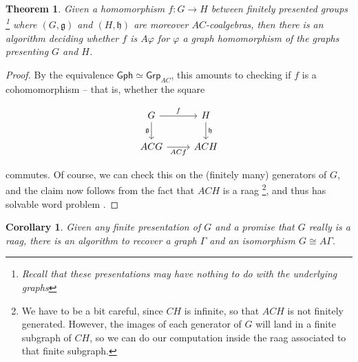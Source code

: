 \documentclass[12pt]{article}
\newtheorem{thm}{Theorem}
\newtheorem{cor}{Corollary}
\theoremstyle{definition}
\theoremstyle{theorem}
\newcommand*{\catFont}[1]{\mathsf{#1}}
\newcommand{\Grp}{\catFont{Grp}}
\begin{document}
\begin{thm}
  Given a homomorphism $f : G \to H$ between finitely presented groups%
  \footnote{Recall that these presentations may have nothing to do with the 
  underlying graphs} where $(G,\mathfrak{g})$ and $(H,\mathfrak{h})$ are 
  moreover $AC$-coalgebras, then there is an algorithm deciding 
  whether $f$ is $A \varphi$ for $\varphi$ a graph homomorphism of the graphs 
  presenting $G$ and $H$.
\end{thm}

\begin{proof}
    By the equivalence $\mathsf{Gph} \simeq \Grp_{AC}$, this amounts to 
    checking if $f$ is a cohomomorphism -- that is, whether the square

    \[
        \begin{tikzcd}
            G & H \\
            ACG & ACH
            \arrow["f", from=1-1, to=1-2]
            \arrow["\mathfrak{g}"', from=1-1, to=2-1]
            \arrow["ACf"', from=2-1, to=2-2]
            \arrow["\mathfrak{h}", from=1-2, to=2-2]
        \end{tikzcd}
    \]

    commutes. Of course, we can check this on the (finitely many) generators
    of $G$, 
    and the claim now follows from the fact that $ACH$ is a raag%
    \footnote{We have to be a bit careful, since $CH$ is infinite, so that 
    $ACH$ is not finitely generated. However, the images of each generator 
    of $G$ will land in a finite subgraph of $CH$, so we can do our 
    computation inside the raag associated to that finite subgraph.}, and thus
    has solvable word problem \cite{charneyIntroductionRightangledArtin2007}.
\end{proof}

\begin{cor}\label{cor:recover-graph}
  Given \emph{any} finite presentation of $G$ and a promise that $G$ really 
  is a raag, there is an algorithm to recover a graph $\Gamma$ and an 
  isomorphism $G \cong A \Gamma$.
\end{cor}
\end{document}
